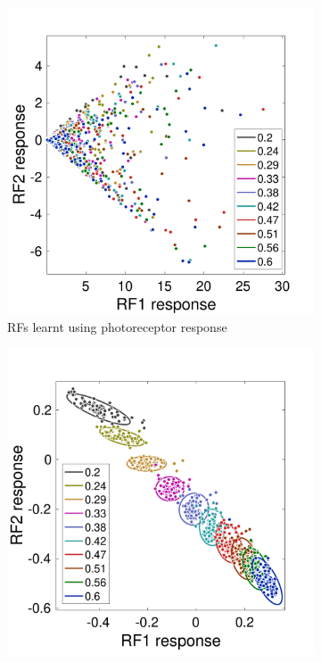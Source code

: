 \documentclass{jov}
\begin{document}
\begin{figure}
\centering
    \begin{subfigure}[b]{0.3	 \textwidth}   
        \includegraphics[width=\textwidth]{../Figures/Figure11/Figure11_a.pdf}
        \caption{RFs learnt using photoreceptor response}
        \label{fig:isomerizationFails}
    \end{subfigure}
        \begin{subfigure}[b]{0.3 \textwidth}
        \includegraphics[width=\textwidth]{../Figures/Figure11/Figure11_b.pdf}

\end{subfigure}
\end{figure}
\end{document}
